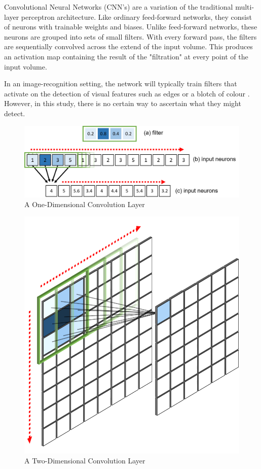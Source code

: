 \documentclass[11pt,oneside,openany,a4paper,english, report, goldenblock
]{usthesis}
\begin{document}
Convolutional Neural Networks (CNN's) are a variation of the traditional multi-layer perceptron architecture. Like ordinary feed-forward networks, they consist of neurons with trainable weights and biases. Unlike feed-forward networks, these neurons are grouped into sets of small filters. With every forward pass, the filters are sequentially convolved across the extend of the input volume. This produces an activation map containing the result of the "filtration" at every point of the input volume.

In an image-recognition setting, the network will typically train filters that activate on the detection of visual features such as edges or a blotch of colour \citep{cs231n}. However, in this study, there is no certain way to ascertain what they might detect.

\begin{figure}[h]
	\centering
	\includegraphics[width=0.9\linewidth]{Images/Diagrams/1D_Convolution}
	\caption[1D Convolutional Layer]{A One-Dimensional Convolution Layer}
	\label{fig:1dconvolution}
\end{figure}

\begin{figure}[h]
	\centering
	\includegraphics[width=0.4\linewidth]{Images/Diagrams/2D_Convolution}
	\caption[2D Convolution Layer]{A Two-Dimensional Convolution Layer}
	\label{fig:2dconvolution}
\end{figure}
\end{document}
